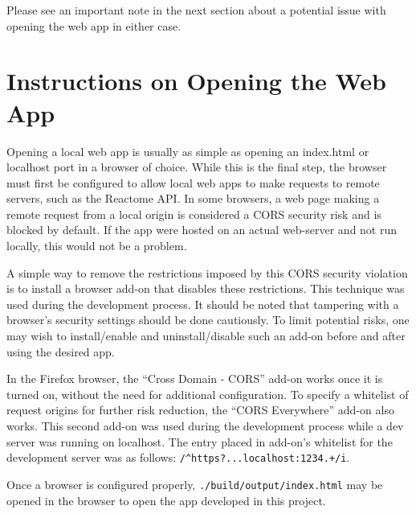 \documentclass[12pt]{report}
\begin{document}
\begin{appendices}
Please see an important note in the next section about a potential issue with opening the web app in either case.

\section{Instructions on Opening the Web App}
Opening a local web app is usually as simple as opening an index.html or localhost port in a browser of choice. While this is the final step, the browser must first be configured to allow local web apps to make requests to remote servers, such as the Reactome API. In some browsers, a web page making a remote request from a local origin is considered a CORS security risk and is blocked by default. If the app were hosted on an actual web-server and not run locally, this would not be a problem.

A simple way to remove the restrictions imposed by this CORS security violation is to install a browser add-on that disables these restrictions. This technique was used during the development process. It should be noted that tampering with a browser's security settings should be done cautiously. To limit potential risks, one may wish to install/enable and uninstall/disable such an add-on before and after using the desired app.

In the Firefox browser, the ``Cross Domain - CORS'' add-on works once it is turned on, without the need for additional configuration. To specify a whitelist of request origins for further risk reduction, the ``CORS Everywhere'' add-on also works. This second add-on was used during the development process while a dev server was running on localhost. The entry placed in add-on's whitelist for the development server was as follows: \verb|/^https?...localhost:1234.+/i|.

Once a browser is configured properly, \verb|./build/output/index.html| may be opened in the browser to open the app developed in this project.
\end{appendices}
\end{document}
